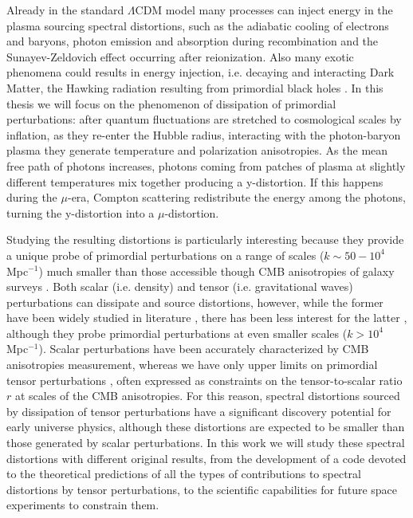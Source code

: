 Already in the standard $\Lambda$CDM model many processes can inject energy in the plasma sourcing spectral distortions, such as the
adiabatic cooling of electrons and baryons, photon emission and absorption during recombination and the Sunayev-Zeldovich effect occurring after reionization. Also many exotic phenomena could results in energy injection, i.e. decaying and interacting Dark Matter, the Hawking radiation resulting from primordial black holes \cite{Lucca_2020}. In this thesis we will focus on the phenomenon of dissipation of primordial perturbations: after quantum fluctuations are stretched to cosmological scales by inflation, as they re-enter the Hubble radius, interacting with the photon-baryon plasma they generate temperature and polarization anisotropies. As the mean free path of photons increases, photons coming from patches of plasma at slightly different temperatures mix together producing a y-distortion. If this happens during the $\mu$-era, Compton scattering redistribute the energy among the photons, turning the y-distortion into a $\mu$-distortion.

Studying the resulting distortions is particularly interesting because they provide a unique probe of primordial perturbations on a range of scales ($k\sim50-10^{4}$ Mpc$^{-1}$) much smaller than those accessible though CMB anisotropies of galaxy surveys \cite{chlubafuturestepscosmologyusing}. Both scalar (i.e. density) and tensor (i.e. gravitational waves) perturbations can dissipate and source distortions, however, while the former have been widely studied in literature \cite{Lucca_2020,Chluba_2x2}, there has been less interest for the latter \cite{Chluba_tens_diss}, although they probe primordial perturbations at even smaller scales ($k>10^{4}$ Mpc$^{-1}$). Scalar perturbations have been accurately characterized by CMB anisotropies measurement, whereas we have only upper limits on primordial tensor perturbations \cite{Ade_2021,planck2018results}, often expressed as constraints on the tensor-to-scalar ratio $r$ at scales of the CMB anisotropies. For this reason, spectral distortions sourced by dissipation of tensor perturbations have a significant discovery potential for early universe physics, although these distortions are expected to be smaller than those generated by scalar perturbations. In this work we will study these spectral distortions with different original results, from the development of a code devoted to the theoretical predictions of all the types of contributions to spectral distortions by tensor perturbations, to the scientific capabilities for future space experiments to constrain them.


